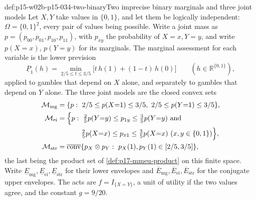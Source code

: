 \begin{hbdefinition}{def:p15-w02b-p15-034-two-binary}{Two imprecise binary marginals and three joint models}
Let \(X,Y\) take values in \(\{0,1\}\), and let them be logically
independent: \(\Omega=\{0,1\}^2\), every pair of values being possible.
Write a joint mass as \(p=(p_{00},p_{01},p_{10},p_{11})\), with
\(p_{xy}\) the probability of \(X=x,Y=y\), and write
\(p(X{=}x)\), \(p(Y{=}y)\) for its marginals. The marginal assessment for
each variable is the lower prevision
\[
 \underline P_1(h)=\min_{2/5\leq t\leq3/5}\bigl[t\,h(1)+(1-t)\,h(0)\bigr]
 \qquad(h\in\mathbb R^{\{0,1\}}),
\]
applied to gambles that depend on \(X\) alone, and separately to gambles
that depend on \(Y\) alone. The three joint models are the closed convex
sets
\[
\begin{aligned}
 \mathcal M_{\mathrm{mg}}&=\{p:\ 2/5\leq p(X{=}1)\leq3/5,\ 2/5\leq p(Y{=}1)\leq3/5\},\\
 \mathcal M_{\mathrm{ei}}&=\Bigl\{p:\ \tfrac25p(Y{=}y)\leq p_{1y}\leq\tfrac35p(Y{=}y)
   \text{ and}\\
 &\hphantom{{}=\Bigl\{p:\ }
   \tfrac25p(X{=}x)\leq p_{x1}\leq\tfrac35p(X{=}x)\ (x,y\in\{0,1\})\Bigr\},\\
 \mathcal M_{\mathrm{str}}&=\overline{\operatorname{conv}}
   \{p_X\otimes p_Y:\ p_X(1),p_Y(1)\in[2/5,3/5]\},
\end{aligned}
\]
the last being the product set of \cref{def:p17-mmeu-product} on this
finite space. Write \(\underline E_{\mathrm{mg}},\underline
E_{\mathrm{ei}},\underline E_{\mathrm{str}}\) for their lower envelopes
and \(\overline E_{\mathrm{mg}},\overline E_{\mathrm{ei}},\overline
E_{\mathrm{str}}\) for the conjugate upper envelopes. The acts are
\(f=I_{\{X=Y\}}\), a unit of utility if the two values agree, and the
constant \(g=9/20\).
\end{hbdefinition}

